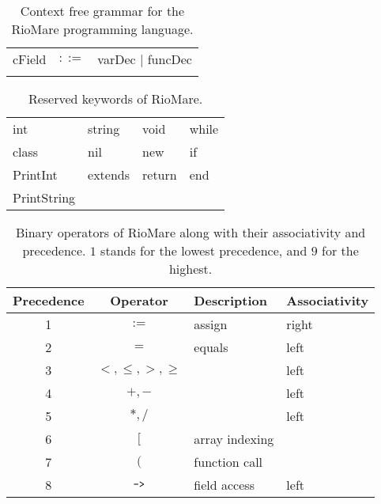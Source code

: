 \documentclass{article}
\begin{document}
\begin{table}[h]
\begin{tabular}{ l c l }
  cField      & $::=$ & varDec $|$ funcDec                                             \\ \\
\end{tabular}
\caption{
Context free grammar for the RioMare programming language.
\label{Table_CFG_Of_RioMare}}
\end{table}

\begin{table}[h]
\centering
\begin{tabular}{ l l l l}
  int         & string  & void   & while \\
  class       & nil     & new    & if    \\
  PrintInt    & extends & return & end   \\
  PrintString &         &        &       \\
\end{tabular}
\caption{
Reserved keywords of RioMare.
\label{Table_Reserved_Keywords_of_RioMare}}
\end{table}

\begin{table}[h]
\centering
\begin{tabular}{|c|c|l|l| }
  \hline
  Precedence       & Operator & Description & Associativity \\
  \hline
  \hline
  1                & $:=$            & assign         & right \\
  \hline
  2                & $=$             & equals         & left  \\
  \hline
  3                & $<,\leq,>,\geq$ &                & left  \\
  \hline
  4                & $+,-$           &                & left  \\
  \hline
  5                & $*,/$           &                & left  \\
  \hline
  6                & $[$             & array indexing &       \\
  \hline
  7                & $($             & function call  &       \\
  \hline
  8                & $\verb"->"$     & field access   & left  \\
  \hline
\end{tabular}
\caption{
Binary operators of RioMare along with their associativity and precedence.
$1$ stands for the lowest precedence, and $9$ for the highest.
\label{Table_Binary_Operators_Of_RioMare}}
\end{table}
\end{document}

